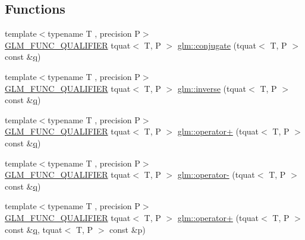 \subsection*{Functions}
\begin{DoxyCompactItemize}
\item 
{\footnotesize template$<$typename T , precision P$>$ }\\\mbox{\hyperlink{setup_8hpp_a33fdea6f91c5f834105f7415e2a64407}{G\+L\+M\+\_\+\+F\+U\+N\+C\+\_\+\+Q\+U\+A\+L\+I\+F\+I\+ER}} tquat$<$ T, P $>$ \mbox{\hyperlink{group__gtc__quaternion_gab1ace864fbf189ffa368950001808a3c}{glm\+::conjugate}} (tquat$<$ T, P $>$ const \&\mbox{\hyperlink{glad_8h_a514729309336df22bcc8eda979d6ced4}{q}})
\item 
{\footnotesize template$<$typename T , precision P$>$ }\\\mbox{\hyperlink{setup_8hpp_a33fdea6f91c5f834105f7415e2a64407}{G\+L\+M\+\_\+\+F\+U\+N\+C\+\_\+\+Q\+U\+A\+L\+I\+F\+I\+ER}} tquat$<$ T, P $>$ \mbox{\hyperlink{group__gtc__quaternion_ga5f47300c024c2d809944e6ac661d6d14}{glm\+::inverse}} (tquat$<$ T, P $>$ const \&\mbox{\hyperlink{glad_8h_a514729309336df22bcc8eda979d6ced4}{q}})
\item 
{\footnotesize template$<$typename T , precision P$>$ }\\\mbox{\hyperlink{setup_8hpp_a33fdea6f91c5f834105f7415e2a64407}{G\+L\+M\+\_\+\+F\+U\+N\+C\+\_\+\+Q\+U\+A\+L\+I\+F\+I\+ER}} tquat$<$ T, P $>$ \mbox{\hyperlink{group__gtc__quaternion_ga6443d80d8429baec64193d0e31e580c8}{glm\+::operator+}} (tquat$<$ T, P $>$ const \&\mbox{\hyperlink{glad_8h_a514729309336df22bcc8eda979d6ced4}{q}})
\item 
{\footnotesize template$<$typename T , precision P$>$ }\\\mbox{\hyperlink{setup_8hpp_a33fdea6f91c5f834105f7415e2a64407}{G\+L\+M\+\_\+\+F\+U\+N\+C\+\_\+\+Q\+U\+A\+L\+I\+F\+I\+ER}} tquat$<$ T, P $>$ \mbox{\hyperlink{group__gtc__quaternion_ga76d2d3e18c09dbd336ba90b498fefbba}{glm\+::operator-\/}} (tquat$<$ T, P $>$ const \&\mbox{\hyperlink{glad_8h_a514729309336df22bcc8eda979d6ced4}{q}})
\item 
{\footnotesize template$<$typename T , precision P$>$ }\\\mbox{\hyperlink{setup_8hpp_a33fdea6f91c5f834105f7415e2a64407}{G\+L\+M\+\_\+\+F\+U\+N\+C\+\_\+\+Q\+U\+A\+L\+I\+F\+I\+ER}} tquat$<$ T, P $>$ \mbox{\hyperlink{group__gtc__quaternion_ga517657374d8ca180d63c33ff9430518a}{glm\+::operator+}} (tquat$<$ T, P $>$ const \&\mbox{\hyperlink{glad_8h_a514729309336df22bcc8eda979d6ced4}{q}}, tquat$<$ T, P $>$ const \&p)

\end{DoxyCompactItemize}

